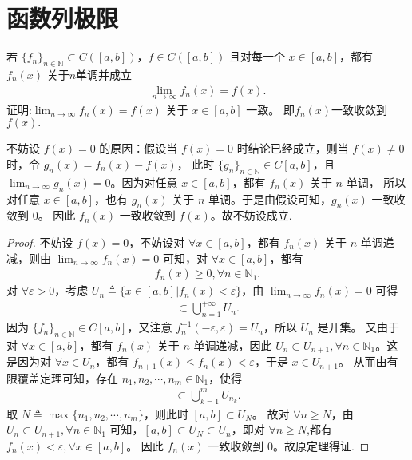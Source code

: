 \documentclass[../../main.tex]{subfiles}
\begin{document}
\section{函数列极限}

\begin{theorem}[Dini定理]\label{theorem:Dini定理(数分版本)}
若 \(\{f_n\}_{n\in\mathbb{N}}\subset C([a,b])\)，\(f\in C([a,b])\) 且对每一个 \(x\in [a,b]\)，都有 \(f_n(x)\) 关于$n$单调并成立
\begin{align*}
\lim_{n\rightarrow\infty}f_n(x)=f(x).
\end{align*}
证明:\(\lim_{n\rightarrow\infty}f_n(x)=f(x)\) 关于 \(x\in [a,b]\) 一致。 即$f_n(x)$一致收敛到$f(x).$
\end{theorem}
\begin{remark}
不妨设 \(f(x) = 0\) 的原因：假设当 \(f(x) = 0\) 时结论已经成立，则当 \(f(x)\ne 0\) 时，令 \(g_n(x)=f_n(x)-f(x)\)，
此时 \(\{g_n\}_{n\in \mathbb{N}}\in C[a,b]\)，且 \(\lim_{n\rightarrow \infty}g_n(x)=0\)。因为对任意 \(x\in [a,b]\)，都有 \(f_n(x)\) 关于 \(n\) 单调，
所以对任意 \(x\in [a,b]\)，也有 \(g_n(x)\) 关于 \(n\) 单调。于是由假设可知，\(g_n(x)\) 一致收敛到 \(0\)。
因此 \(f_n(x)\) 一致收敛到 \(f(x)\)。故不妨设成立.
\end{remark}
\begin{proof}
不妨设 \(f(x) = 0\)，不妨设对 \(\forall x\in [a,b]\)，都有 \(f_n(x)\) 关于 \(n\) 单调递减，则由 \(\lim_{n\rightarrow \infty}f_n(x)=0\) 可知，对 \(\forall x\in [a,b]\)，都有
\begin{align*}
f_n(x)\geqslant 0,\forall n\in \mathbb{N}_1.
\end{align*}
对 \(\forall \varepsilon>0\)，考虑 \(U_n\triangleq \{x\in [a,b]|f_n(x)<\varepsilon\}\)，由 \(\lim_{n\rightarrow \infty}f_n(x)=0\) 可得
\begin{align*}
[a,b]\subset \bigcup_{n = 1}^{+\infty}U_n.
\end{align*}
因为 \(\{f_n\}_{n\in \mathbb{N}}\in C[a,b]\)，又注意 \(f_{n}^{-1}(-\varepsilon,\varepsilon)=U_n\)，所以 \(U_n\) 是开集。
又由于对 \(\forall x\in [a,b]\)，都有 \(f_n(x)\) 关于 \(n\) 单调递减，因此 \(U_n\subset U_{n + 1},\forall n\in \mathbb{N}_1\)。这是因为对 \(\forall x\in U_n\)，都有 \(f_{n + 1}(x)\leqslant f_n(x)<\varepsilon\)，于是 \(x\in U_{n + 1}\)。
从而由有限覆盖定理可知，存在 \(n_1,n_2,\cdots,n_m\in \mathbb{N}_1\)，使得
\begin{align*}
[a,b]\subset \bigcup_{k = 1}^mU_{n_k}.
\end{align*}
取 \(N\triangleq \max\{n_1,n_2,\cdots,n_m\}\)，则此时 \([a,b]\subset U_N\)。
故对 \(\forall n\geqslant N\)，由 \(U_n\subset U_{n + 1},\forall n\in \mathbb{N}_1\) 可知，\([a,b]\subset U_N\subset U_n\)，即对 \(\forall n\geqslant N\),都有 \(f_n(x)<\varepsilon,\forall x\in [a,b]\)。
因此 \(f_n(x)\) 一致收敛到 $0$。故原定理得证. 
\end{proof}
\end{document}
